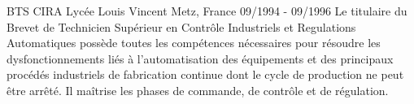 \begin{cventries}
  \cventry
    {BTS CIRA}
    {Lycée Louis Vincent} %
    {Metz, France} %
    {09/1994 - 09/1996}
    {
      Le titulaire du Brevet de Technicien Supérieur en Contrôle Industriels et Regulations Automatiques
      possède toutes les compétences nécessaires pour résoudre les dysfonctionnements liés à l'automatisation 
      des équipements et des principaux procédés industriels de fabrication continue dont le cycle de 
      production ne peut être arrêté. Il maîtrise les phases de commande, de contrôle et de régulation.
    }

\end{cventries}
